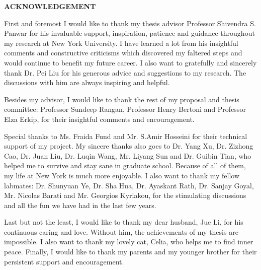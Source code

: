 \newpage
\begin{center}
{\large\bf ACKNOWLEDGEMENT}\vspace{0.3in}
\end{center}
\par First and foremost I would like to thank my thesis advisor Professor Shivendra S. Panwar for his invaluable support, inspiration, patience and guidance throughout my research at New York University. I have learned a lot from his insightful comments and constructive criticisms which discovered my faltered steps and would continue to benefit my future career. I also want to gratefully and sincerely thank Dr. Pei Liu for his generous advice and suggestions to my research. The discussions with him are always inspiring and helpful.
\par Besides my advisor, I would like to thank the rest of my proposal and thesis committee: Professor Sundeep Rangan, Professor Henry Bertoni and Professor Elza Erkip, for their insightful comments and encouragement.
\par Special thanks to Ms. Fraida Fund and Mr. S.Amir Hosseini for their technical support of my project. My sincere thanks also goes to Dr. Yang Xu, Dr. Zizhong Cao, Dr. Juan Liu, Dr. Luqin Wang, Mr. Liyang Sun and Dr. Guibin Tian, who helped me to survive and stay sane in graduate school. Because of all of them, my life at New York is much more enjoyable. I also want to thank my fellow labmates: Dr. Shunyuan Ye, Dr. Sha Hua, Dr. Ayaskant Rath, Dr. Sanjay Goyal, Mr. Nicolas Barati and Mr. Georgios Kyriakou, for the stimulating discussions and all the fun we have had in the last few years.
\par Last but not the least, I would like to thank my dear husband, Jue Li, for his continuous caring and love. Without him, the achievements of my thesis are impossible. I also want to thank my lovely cat, Celia, who helps me to find inner peace. Finally, I would like to thank my parents and my younger brother for their persistent support and encouragement.




